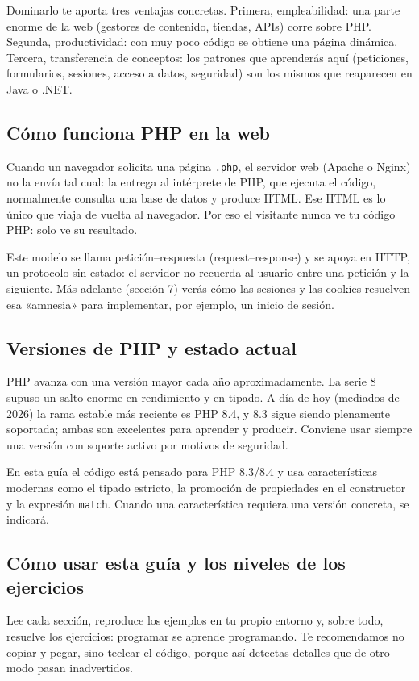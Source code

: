 \documentclass[11pt]{article}
\begin{document}
Dominarlo te aporta tres ventajas concretas. Primera, empleabilidad: una parte enorme de la web (gestores de contenido, tiendas, APIs) corre sobre PHP. Segunda, productividad: con muy poco código se obtiene una página dinámica. Tercera, transferencia de conceptos: los patrones que aprenderás aquí (peticiones, formularios, sesiones, acceso a datos, seguridad) son los mismos que reaparecen en Java o .NET.

\subsection{Cómo funciona PHP en la web}
Cuando un navegador solicita una página \texttt{.\allowbreak{}php}, el servidor web (Apache o Nginx) no la envía tal cual: la entrega al intérprete de PHP, que ejecuta el código, normalmente consulta una base de datos y produce HTML. Ese HTML es lo único que viaja de vuelta al navegador. Por eso el visitante nunca ve tu código PHP: solo ve su resultado.

Este modelo se llama petición–respuesta (request–response) y se apoya en HTTP, un protocolo sin estado: el servidor no recuerda al usuario entre una petición y la siguiente. Más adelante (sección 7) verás cómo las sesiones y las cookies resuelven esa «amnesia» para implementar, por ejemplo, un inicio de sesión.

\subsection{Versiones de PHP y estado actual}
PHP avanza con una versión mayor cada año aproximadamente. La serie 8 supuso un salto enorme en rendimiento y en tipado. A día de hoy (mediados de 2026) la rama estable más reciente es PHP 8.4, y 8.3 sigue siendo plenamente soportada; ambas son excelentes para aprender y producir. Conviene usar siempre una versión con soporte activo por motivos de seguridad.

En esta guía el código está pensado para PHP 8.3/8.4 y usa características modernas como el tipado estricto, la promoción de propiedades en el constructor y la expresión \texttt{match}. Cuando una característica requiera una versión concreta, se indicará.

\subsection{Cómo usar esta guía y los niveles de los ejercicios}
Lee cada sección, reproduce los ejemplos en tu propio entorno y, sobre todo, resuelve los ejercicios: programar se aprende programando. Te recomendamos no copiar y pegar, sino teclear el código, porque así detectas detalles que de otro modo pasan inadvertidos.
\end{document}
